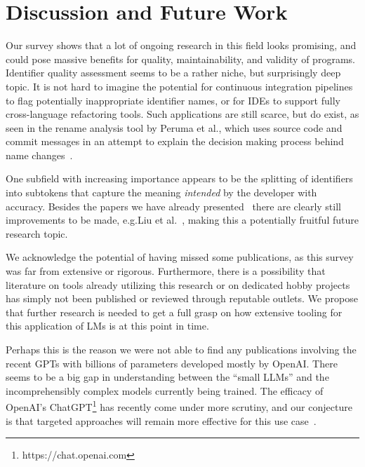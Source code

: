 \documentclass[conference]{IEEEtran}
\begin{document}


\section{Discussion and Future Work}
\label{sec:Discussion-and-Future-Work}

Our survey shows that a lot of ongoing research in this field looks promising, and could
pose massive benefits for quality, maintainability, and validity of programs. Identifier
quality assessment seems to be a rather niche, but surprisingly deep topic. It is not hard
to imagine the potential for continuous integration pipelines to flag potentially
inappropriate identifier names, or for IDEs to support fully cross-language refactoring
tools. Such applications are still scarce, but do exist, as seen in the rename analysis
tool by Peruma et al.\@, which uses source code and commit messages in an attempt to
explain the decision making process behind name changes~\cite{Peruma2019}.

One subfield with increasing importance appears to be the splitting of identifiers into
subtokens that capture the meaning \emph{intended} by the developer with accuracy. Besides
the papers we have already presented~\cite{Gao2019IdentGen, Shi2022Splitting,
Allamanis2015Suggesting} there are clearly still improvements to be made, e.g.\@ Liu et
al.\@~\cite{Liu2021CHIS}, making this a potentially fruitful future research topic.

We acknowledge the potential of having missed some publications, as this survey was far
from extensive or rigorous. Furthermore, there is a possibility that literature on tools
already utilizing this research or on dedicated hobby projects has simply not been
published or reviewed through reputable outlets. We propose that further research is
needed to get a full grasp on how extensive tooling for this application of \acp{LM} is at
this point in time.

Perhaps this is the reason we were not able to find any publications involving the recent
\acp{GPT} with billions of parameters developed mostly by OpenAI. There seems to be a big
gap in understanding between the \enquote{small \acp{LLM}} and the incomprehensibly
complex models currently being trained. The efficacy of OpenAI's
ChatGPT\footnote{https://chat.openai.com} has recently come under more scrutiny, and our
conjecture is that targeted approaches will remain more effective for this use
case~\cite{Wu2023ChatGPT}.
\end{document}
